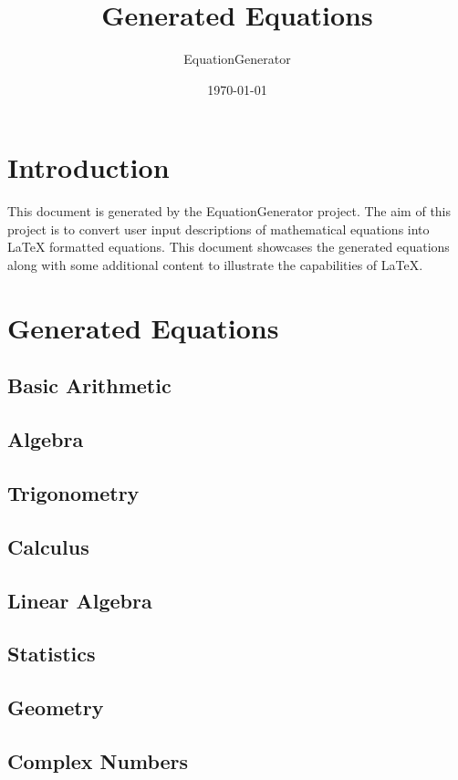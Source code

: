\documentclass{article}
\begin{document}
\title{Generated Equations}
\author{EquationGenerator}
\date{\today}
\maketitle

\tableofcontents
\newpage

\section{Introduction}
This document is generated by the EquationGenerator project. The aim of this project is to convert user input descriptions of mathematical equations into LaTeX formatted equations. This document showcases the generated equations along with some additional content to illustrate the capabilities of LaTeX.

\section{Generated Equations}

\subsection{Basic Arithmetic}


\subsection{Algebra}


\subsection{Trigonometry}


\subsection{Calculus}


\subsection{Linear Algebra}


\subsection{Statistics}


\subsection{Geometry}


\subsection{Complex Numbers}

\end{document}
